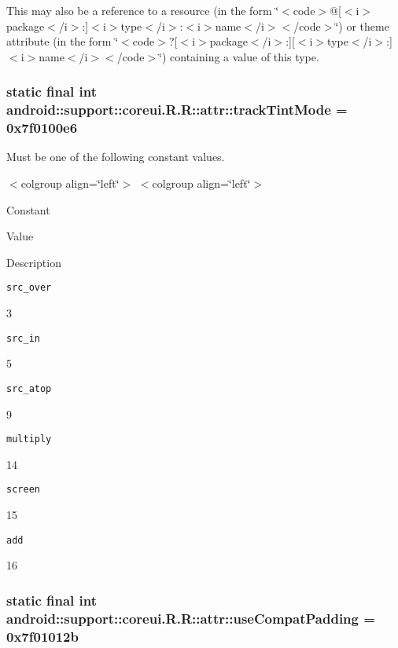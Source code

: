 This may also be a reference to a resource (in the form \char`\"{}$<$code$>$@\mbox{[}$<$i$>$package$<$/i$>$:\mbox{]}$<$i$>$type$<$/i$>$:$<$i$>$name$<$/i$>$$<$/code$>$\char`\"{}) or theme attribute (in the form \char`\"{}$<$code$>$?\mbox{[}$<$i$>$package$<$/i$>$:\mbox{]}\mbox{[}$<$i$>$type$<$/i$>$:\mbox{]}$<$i$>$name$<$/i$>$$<$/code$>$\char`\"{}) containing a value of this type. \hypertarget{classandroid_1_1support_1_1coreui_1_1_r_1_1attr_caf96cbbf76fb818505b508d3d8c9a97}{
\subsubsection[{trackTintMode}]{\setlength{\rightskip}{0pt plus 5cm}static final int android::support::coreui.R.R::attr::trackTintMode = 0x7f0100e6}}
\label{classandroid_1_1support_1_1coreui_1_1_r_1_1attr_caf96cbbf76fb818505b508d3d8c9a97}


Must be one of the following constant values. \begin{TabularC}{0}
\hline
\end{TabularC}
$<$colgroup align=\char`\"{}left\char`\"{}$>$ $<$colgroup align=\char`\"{}left\char`\"{}$>$ 

Constant

Value

Description 

{\tt src\_\-over}

3

{\tt src\_\-in}

5

{\tt src\_\-atop}

9

{\tt multiply}

14

{\tt screen}

15

{\tt add}

16\hypertarget{classandroid_1_1support_1_1coreui_1_1_r_1_1attr_9e13180a95b2908f407f36e1db5658ee}{
\subsubsection[{useCompatPadding}]{\setlength{\rightskip}{0pt plus 5cm}static final int android::support::coreui.R.R::attr::useCompatPadding = 0x7f01012b}}
\label{classandroid_1_1support_1_1coreui_1_1_r_1_1attr_9e13180a95b2908f407f36e1db5658ee}


